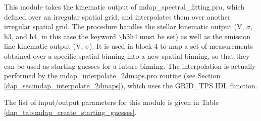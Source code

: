 \documentclass[11pt]{book}
\begin{document}
This module takes the kinematic output of mdap\_spectral\_fitting.pro,
which defined over an irregular spatial grid, and interpolates them
over another irregular spatial grid. The procedure handles the stellar
kinematic output (V, $\sigma$, h3, and h4, in this case the keyword
$\backslash$h3h4 must be set) as well as the emission line kinematic
output (V, $\sigma$). It is used in block 4 to map a set of
measurements obtained over a specific spatial binning into a new
spatial binning, so that they can be used as starting guesses for a
future binning. The interpolation is actually performed by the
mdap\_interpolate\_2dmaps.pro routine (see Section
\ref{dap_sec:mdap_interpolate_2dmaps}), which uses the GRID\_TPS IDL
function.

The list of input/output parameters for this module is given in Table
\ref{dap_tab:mdap_create_starting_guesses}.
\end{document}
